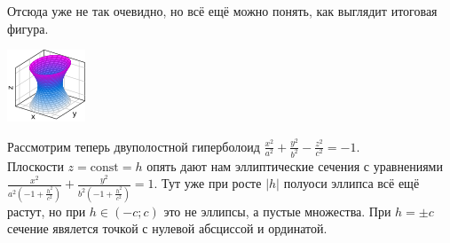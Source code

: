 \documentclass{article}
\begin{document}
\begin{itemize}
\begin{Example}
\begin{center}
                \fi
            \end{center}
            Отсюда уже не так очевидно, но всё ещё можно понять, как выглядит итоговая фигура.
            \begin{center}
                \ifplotsrender
                \else
                \includegraphics{Images/Поверхности 2 порядка/гиперболоид1.png}
                \fi
            \end{center}
        \end{Example}
        \begin{Example}
            Рассмотрим теперь двуполостной гиперболоид $\frac{x^2}{a^2}+\frac{y^2}{b^2}-\frac{z^2}{c^2}=-1$.\\
            Плоскости $z=\mathrm{const}=h$ опять дают нам эллиптические сечения с уравнениями $\frac{x^2}{a^2\left(-1+\frac{h^2}{c^2}\right)}+\frac{y^2}{b^2\left(-1+\frac{h^2}{c^2}\right)}=1$. Тут уже при росте $|h|$ полуоси эллипса всё ещё растут, но при $h\in(-c;c)$ это не эллипсы, а пустые множества. При $h=\pm c$ сечение явялется точкой с нулевой абсциссой и ординатой.
            \begin{center}

\end{center}
\end{Example}
\end{itemize}
\end{document}
